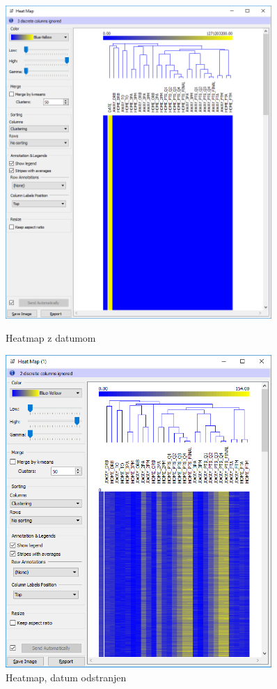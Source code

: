 \documentclass[a4paper,11pt]{article}
\begin{document}
\begin{figure}[H]
    \centering
    \begin{minipage}{0.5\textwidth}
        \centering
        \includegraphics[width=0.9\textwidth]{OC_attrib-cluster.png}
        \caption{Heatmap z datumom}
        \label{slika3}
    \end{minipage}\hfill
    \begin{minipage}{0.5\textwidth}
        \centering
        \includegraphics[width=0.9\textwidth]{OC_attrib-cluster-no_date.png}
        \caption{Heatmap, datum odstranjen}
        \label{slika4}
    \end{minipage}
\end{figure}
\end{document}
